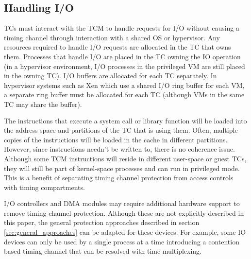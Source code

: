 \subsection{Handling I/O}
TCs must interact with the TCM to handle requests for I/O without causing a 
timing channel through interaction with a shared OS or hypervisor.
Any resources required to handle I/O requests are allocated in the TC that owns 
them.
Processes that handle I/O are placed in the TC owning the IO 
operation (in a hypervisor environment, I/O processes in the privileged
VM are still placed in the owning TC).
I/O buffers are allocated for each TC separately. In hypervisor systems such as
Xen\cite{xen-sosp03} which use a shared I/O ring buffer for each VM, a separate
ring buffer must be allocated for each TC (although VMs in the same TC may share
the buffer). 

The instructions that execute a system call or library function will be loaded
into the address space and partitions of the TC that is using them. Often, multiple
copies of the instructions will be loaded in the cache in different partitions.
However, since instructions needn't be written to, there is no coherence issue. 
Although some TCM instructions will reside in different user-space or guest 
TCs, they will still be part of kernel-space processes and can run in 
privileged mode. This is a benefit of separating timing channel protection 
from access controls with timing compartments.


I/O controllers and DMA modules may require additional hardware support to 
remove timing channel protection. Although these are not explicitly described 
in this paper, the general protection approaches described in section
\ref{sec:general_approaches} can be adapted for these devices. For example,
some IO devices can only be used by a single process at a time introducing a
contention based timing channel that can be resolved with time multiplexing.

